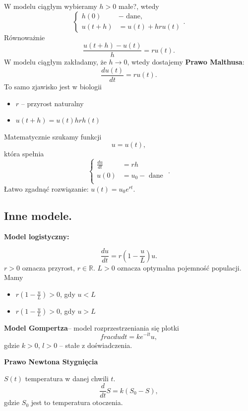 W modelu ciągłym wybieramy $h>0$ małe?, wtedy
\[
\begin{cases}
	h\left( 0 \right) &- \text{ dane,}  \\
	u\left( t+h \right) &= u\left( t \right) + hru\left( t \right)  
\end{cases}
.\] 
Równoważnie 
\[
\frac{u\left( t+h \right) - u\left( t \right) }{h} = ru\left( t \right) 
.\] 
W modelu ciągłym zakładamy, że $h \longrightarrow  0$, wtedy dostajemy \textbf{Prawo Malthusa}:
\[
\frac{du\left( t \right) }{dt} = ru\left( t \right) 
.\] 
To samo zjawisko jest w biologii
\begin{itemize}
	\item $r$ -- przyrost naturalny
	\item $u\left( t+h \right) = u\left( t \right) hrh\left( t \right) $
\end{itemize}

Matematycznie szukamy funkcji
\[
u = u\left( t \right) 
,\] 
która spełnia
\[
\begin{cases}
	\frac{du}{dt} &= rh \\
	u\left( 0 \right) &= u_{0} - \text{ dane } \\
\end{cases}
.\] 
Łatwo zgadnąć rozwiązanie: $u\left( t \right) = u_0e^{rt}$.
\subsection{Inne modele.}

\textbf{Model logistyczny:}

\[
\frac{du}{dt} = r\left( 1 - \frac{u}{L} \right)u
.\] 
$r>0$ oznacza przyrost, $r\in \mathbb{R}$. $L > 0$ oznacza optymalna pojemność populacji. Mamy
\begin{itemize}
	\item $r\left( 1 - \frac{u}{L} \right) > 0$, gdy $u < L$ 
	\item $r\left( 1 - \frac{u}{L} \right) > 0$, gdy $u > L$ 
\end{itemize}

\textbf{Model Gompertza}-- model rozprzestrzeniania się plotki
\[
frac{du}{dt} = ke ^{-lt}u
,\] 
gdzie $k>0$, $l>0$ -- stałe z doświadczenia.

\textbf{Prawo Newtona Stygnięcia}

$S\left( t \right) $ temperatura w danej chwili $t$.
\[
\frac{d}{dt}S = k\left( S_0 - S \right) 
,\]
gdzie $S_0$ jest to temperatura otoczenia.



